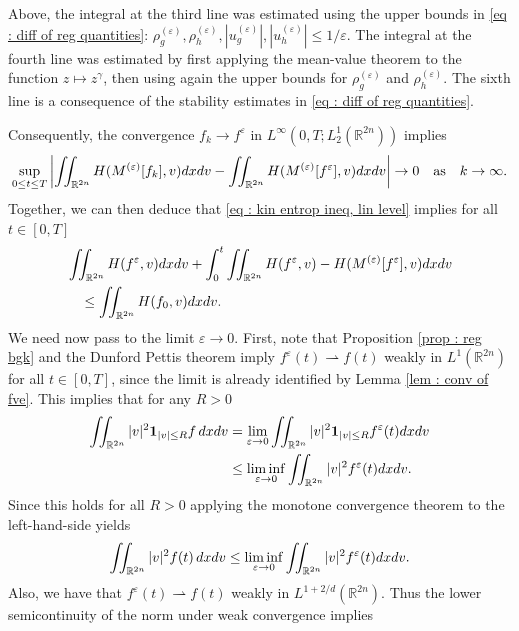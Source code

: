 \documentclass{amsart}
\theoremstyle{plain}
\theoremstyle{remark}
\numberwithin{equation}{section}
\newcommand{\R}{\mathbb{R}}
\newcommand{\ve}{\varepsilon}
\newcommand{\dx}{\textnormal{d}x}
\newcommand{\dv}{\textnormal{d}v}
\newcommand{\weakto}{\rightharpoonup}
\begin{document}
Above, the integral at the third line was estimated using the upper bounds in \eqref{eq : diff of reg quantities}: $\rho_g^{(\ve)},\rho_h^{(\ve)},|u_g^{(\ve)}|,|u_h^{(\ve)}|\le 1/\ve$. The integral at the fourth line was estimated by first applying the mean-value theorem to the function $z\mapsto z^\gamma$, then using again the upper bounds for $\rho_g^{(\ve)}$ and $\rho_h^{(\ve)}$. The sixth line is a consequence of the stability estimates in \eqref{eq : diff of reg quantities}.

Consequently, the convergence $f_k\to f^\ve$ in $L^\infty(0,T;L^1_2(\R^{2n}))$ implies
\begin{align*}
    \sup_{0\le t \le T} \left|\iint_{\R^{2n}} H(M^{(\ve)}[f_k],v)\dx\dv - \iint_{\R^{2n}} H(M^{(\ve)}[f^\ve],v)\dx\dv \right| \to 0 \quad\text{as}\quad k\to\infty.
\end{align*}
Together, we can then deduce that \eqref{eq : kin entrop ineq, lin level} implies for all $t\in [0,T]$
\begin{equation}
\label{eq : kin entrop ineq reg level}
\begin{split}
    &\iint_{\R^{2n}} H(f^\ve,v)\dx\dv + \int_0^t \iint_{\R^{2n}} H(f^\ve,v)-H(M^{(\ve)}[f^\ve],v)\dx\dv\\
    &\quad \le \iint_{\R^{2n}} H(f_0,v)\dx\dv.
    \end{split}
\end{equation}
We need now pass to the limit $\ve\to 0$. First, note that Proposition \ref{prop : reg bgk} and the Dunford Pettis theorem imply $f^\ve(t) \weakto f(t)$ weakly in $L^1(\R^{2n})$ for all $t\in [0,T]$, since the limit is already identified by Lemma \ref{lem : conv of fve}. This implies that for any $R>0$
\begin{equation*}
\begin{split}
    \iint_{\R^{2n}} |v|^2 \mathbf{1}_{|v|\le R} f\, \dx \dv &= \lim_{\ve \to 0} \iint_{\R^{2n}} |v|^2 \mathbf{1}_{|v|\le R} f^\ve(t) \dx \dv \\
    &\le \liminf_{\ve \to 0} \iint_{\R^{2n}} |v|^2 f^\ve(t) \dx \dv.
    \end{split}
\end{equation*}
Since this holds for all $R>0$ applying the monotone convergence theorem to the left-hand-side yields
\begin{align*}
    \iint_{\R^{2n}}|v|^2 f(t)\, \dx \dv \le \liminf_{\ve \to 0} \iint_{\R^{2n}} |v|^2 f^\ve(t) \dx \dv.
\end{align*}
Also, we have that $f^\ve(t) \weakto f(t)$ weakly in $L^{1+2/d}(\R^{2n})$. Thus the lower semicontinuity of the norm under weak convergence implies
\end{document}
